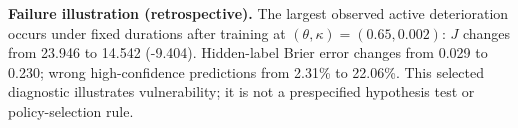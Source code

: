 \textbf{Failure illustration (retrospective).} The largest observed active deterioration occurs under fixed durations after training at $(\theta,\kappa)=(0.65,0.002)$: $J$ changes from 23.946 to 14.542 (-9.404). Hidden-label Brier error changes from 0.029 to 0.230; wrong high-confidence predictions from 2.31\% to 22.06\%. This selected diagnostic illustrates vulnerability; it is not a prespecified hypothesis test or policy-selection rule.
